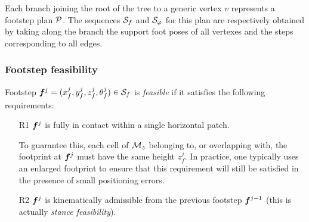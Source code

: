 Each branch joining the root of the tree to a generic vertex $v$ represents a footstep plan $\cal P$. The sequences ${\cal S}_f$ and ${\cal S}_\varphi$ for this plan are respectively obtained by taking along the branch the support foot poses of all vertexes and the steps corresponding to all edges.

\medskip

\subsubsection{Footstep feasibility}

Footstep ${\bm{f}}^j=(x_f^j,y_f^j,z_f^j,\theta_f^j) \in {\cal S}_f$ is \textit{feasible} if it satisfies the following requirements:   

\begin{itemize}

\smallskip
\item[R1] ${\bm{f}}^j$ is fully in contact within a single horizontal patch.

\smallskip
To guarantee this, each cell of ${\cal M}_{z}$ belonging to, or overlapping with, the footprint at ${\bm{f}}^j$ must have the same height $z_{f}^j$. In practice, one typically uses an enlarged footprint to ensure that this requirement will still be satisfied in the presence of small positioning errors.

\smallskip
\item[R2] ${\bm{f}}^j$ is kinematically admissible from the previous footstep ${\bm{f}}^{j-1}$ (this is actually {\em stance feasibility}).


\end{itemize}
